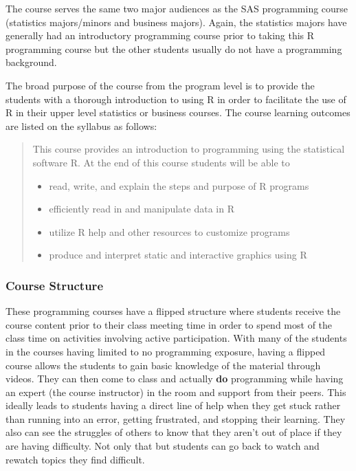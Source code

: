 \documentclass[
  letterpaper,
  DIV=11,
  numbers=noendperiod]{scrartcl}
\providecommand{\tightlist}{%
  \setlength{\itemsep}{0pt}\setlength{\parskip}{0pt}}\usepackage{longtable,booktabs,array}
\begin{document}
The course serves the same two major audiences as the SAS programming
course (statistics majors/minors and business majors). Again, the
statistics majors have generally had an introductory programming course
prior to taking this R programming course but the other students usually
do not have a programming background.

The broad purpose of the course from the program level is to provide the
students with a thorough introduction to using R in order to facilitate
the use of R in their upper level statistics or business courses. The
course learning outcomes are listed on the syllabus as follows:

\begin{quote}
This course provides an introduction to programming using the
statistical software R. At the end of this course students will be able
to

\begin{itemize}
\tightlist
\item
  read, write, and explain the steps and purpose of R programs
\item
  efficiently read in and manipulate data in R
\item
  utilize R help and other resources to customize programs
\item
  produce and interpret static and interactive graphics using R
\end{itemize}
\end{quote}

\hypertarget{course-structure}{%
\subsubsection{Course Structure}\label{course-structure}}

These programming courses have a flipped structure where students
receive the course content prior to their class meeting time in order to
spend most of the class time on activities involving active
participation. With many of the students in the courses having limited
to no programming exposure, having a flipped course allows the students
to gain basic knowledge of the material through videos. They can then
come to class and actually \textbf{do} programming while having an
expert (the course instructor) in the room and support from their peers.
This ideally leads to students having a direct line of help when they
get stuck rather than running into an error, getting frustrated, and
stopping their learning. They also can see the struggles of others to
know that they aren't out of place if they are having difficulty. Not
only that but students can go back to watch and rewatch topics they find
difficult.
\end{document}
